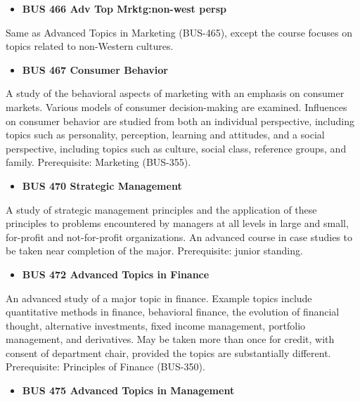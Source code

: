 \documentclass[
  letterpaper,
]{scrbook}
\providecommand{\tightlist}{%
  \setlength{\itemsep}{0pt}\setlength{\parskip}{0pt}}
\begin{document}
\begin{itemize}
\tightlist
\item
  \textbf{BUS 466 Adv Top Mrktg:non-west persp}
\end{itemize}

Same as Advanced Topics in Marketing (BUS-465), except the course
focuses on topics related to non-Western cultures.

\begin{itemize}
\tightlist
\item
  \textbf{BUS 467 Consumer Behavior}
\end{itemize}

A study of the behavioral aspects of marketing with an emphasis on
consumer markets. Various models of consumer decision-making are
examined. Influences on consumer behavior are studied from both an
individual perspective, including topics such as personality,
perception, learning and attitudes, and a social perspective, including
topics such as culture, social class, reference groups, and family.
Prerequisite: Marketing (BUS-355).

\begin{itemize}
\tightlist
\item
  \textbf{BUS 470 Strategic Management}
\end{itemize}

A study of strategic management principles and the application of these
principles to problems encountered by managers at all levels in large
and small, for-profit and not-for-profit organizations. An advanced
course in case studies to be taken near completion of the major.
Prerequisite: junior standing.

\begin{itemize}
\tightlist
\item
  \textbf{BUS 472 Advanced Topics in Finance}
\end{itemize}

An advanced study of a major topic in finance. Example topics include
quantitative methods in finance, behavioral finance, the evolution of
financial thought, alternative investments, fixed income management,
portfolio management, and derivatives. May be taken more than once for
credit, with consent of department chair, provided the topics are
substantially different. Prerequisite: Principles of Finance (BUS-350).

\begin{itemize}
\tightlist
\item
  \textbf{BUS 475 Advanced Topics in Management}
\end{itemize}
\end{document}
